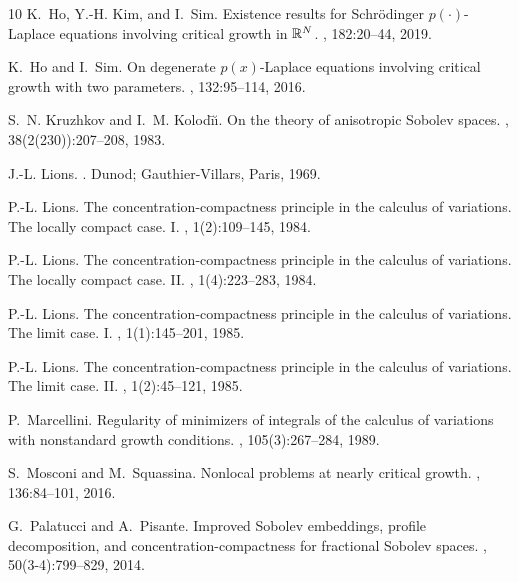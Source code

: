 \documentclass[11pt]{amsart}
\theoremstyle{plain}
\theoremstyle{definition}
\numberwithin{equation}{section}
\begin{document}
\begin{thebibliography}{10}
K.~Ho, Y.-H. Kim, and I.~Sim.
\newblock Existence results for {S}chr\"{o}dinger {$p(\cdot)$}-{L}aplace
  equations involving critical growth in {$\Bbb R^N$}.
, 182:20--44, 2019.

K.~Ho and I.~Sim.
\newblock On degenerate {$p(x)$}-{L}aplace equations involving critical growth
  with two parameters.
, 132:95--114, 2016.

S.~N. Kruzhkov and I.~M. Kolod\={\i}\u{\i}.
\newblock On the theory of anisotropic {S}obolev spaces.
, 38(2(230)):207--208, 1983.

J.-L. Lions.
.
\newblock Dunod; Gauthier-Villars, Paris, 1969.

P.-L. Lions.
\newblock The concentration-compactness principle in the calculus of
  variations. {T}he locally compact case. {I}.
,
  1(2):109--145, 1984.

P.-L. Lions.
\newblock The concentration-compactness principle in the calculus of
  variations. {T}he locally compact case. {II}.
,
  1(4):223--283, 1984.

P.-L. Lions.
\newblock The concentration-compactness principle in the calculus of
  variations. {T}he limit case. {I}.
, 1(1):145--201, 1985.

P.-L. Lions.
\newblock The concentration-compactness principle in the calculus of
  variations. {T}he limit case. {II}.
, 1(2):45--121, 1985.

P.~Marcellini.
\newblock Regularity of minimizers of integrals of the calculus of variations
  with nonstandard growth conditions.
, 105(3):267--284, 1989.

S.~Mosconi and M.~Squassina.
\newblock Nonlocal problems at nearly critical growth.
, 136:84--101, 2016.

G.~Palatucci and A.~Pisante.
\newblock Improved {S}obolev embeddings, profile decomposition, and
  concentration-compactness for fractional {S}obolev spaces.
, 50(3-4):799--829,
  2014.


\end{thebibliography}
\end{document}
